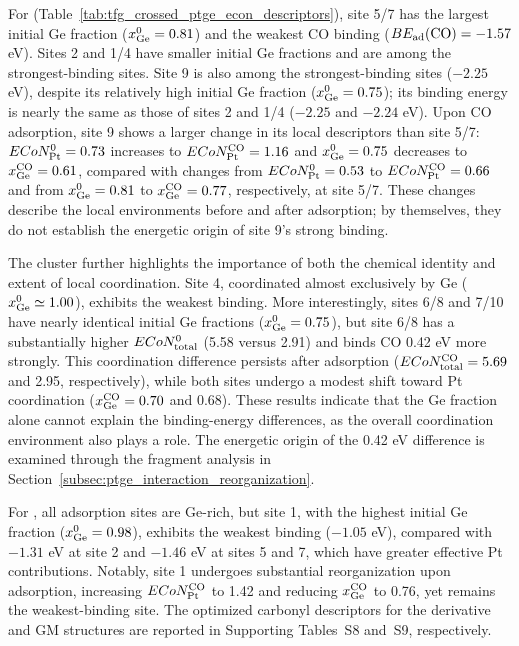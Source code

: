 For  (Table~\ref{tab:tfg_crossed_ptge_econ_descriptors}), site 5/7 has the largest initial Ge fraction ($x_{\rm Ge}^{0}=0.81$) and the weakest CO binding ($BE_{\rm ad}(\ce{CO})=-1.57$ eV). Sites 2 and 1/4 have smaller initial Ge fractions and are among the strongest-binding sites. Site 9 is also among the strongest-binding sites ($-2.25$ eV), despite its relatively high initial Ge fraction ($x_{\rm Ge}^{0}=0.75$); its binding energy is nearly the same as those of sites 2 and 1/4 ($-2.25$ and $-2.24$ eV). Upon CO adsorption, site 9 shows a larger change in its local descriptors than site 5/7: $ECoN_{\rm Pt}^{0}=0.73$ increases to $ECoN_{\rm Pt}^{\ce{CO}}=1.16$ and $x_{\rm Ge}^{0}=0.75$ decreases to $x_{\rm Ge}^{\ce{CO}}=0.61$, compared with changes from $ECoN_{\rm Pt}^{0}=0.53$ to $ECoN_{\rm Pt}^{\ce{CO}}=0.66$ and from {$x_{\rm Ge}^{0}=0.81$} to {$x_{\rm Ge}^{\ce{CO}}=0.77$}, respectively, at site 5/7. These changes describe the local environments before and after adsorption; by themselves, they do not establish the energetic origin of site 9's strong binding.

The  cluster further highlights the importance of both the chemical identity and extent of local coordination. Site 4, coordinated almost exclusively by Ge ($x_{\rm Ge}^{0}\simeq1.00$), exhibits the weakest binding. More interestingly, sites 6/8 and 7/10 have nearly identical initial Ge fractions ($x_{\rm Ge}^{0}=0.75$), but site 6/8 has a substantially higher $ECoN_{\rm total}^{0}$ (5.58 versus 2.91) and binds CO 0.42 eV more strongly. This coordination difference persists after adsorption ($ECoN_{\rm total}^{\ce{CO}}=5.69$ and 2.95, respectively), while both sites undergo a modest shift toward Pt coordination ($x_{\rm Ge}^{\ce{CO}}=0.70$ and 0.68). These results indicate that the Ge fraction alone cannot explain the binding-energy differences, as the overall coordination environment also plays a role. The energetic origin of the 0.42 eV difference is examined through the fragment analysis in Section~\ref{subsec:ptge_interaction_reorganization}.

For , all adsorption sites are Ge-rich, but site 1, with the highest initial Ge fraction ($x_{\rm Ge}^{0}=0.98$), exhibits the weakest binding ($-1.05$ eV), compared with $-1.31$ eV at site 2 and $-1.46$ eV at sites 5 and 7, which have greater effective Pt contributions. Notably, site 1 undergoes substantial reorganization upon adsorption, increasing {$ECoN_{\rm Pt}^{\ce{CO}}$} to 1.42 and reducing {$x_{\rm Ge}^{\ce{CO}}$} to 0.76, yet remains the weakest-binding site. The optimized carbonyl descriptors for the derivative and GM structures are reported in Supporting Tables~S8 and~S9, respectively.

